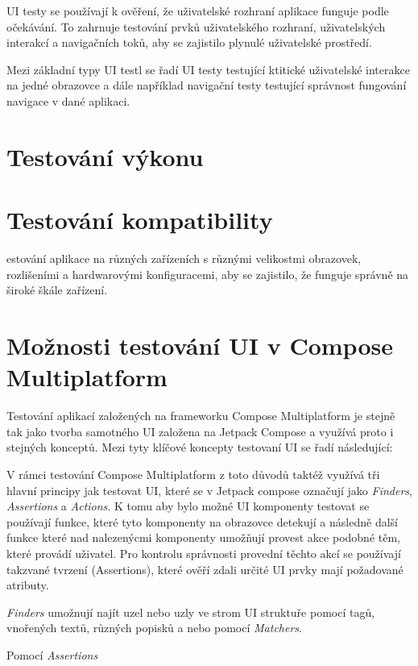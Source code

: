 UI testy se používají k ověření, že uživatelské rozhraní aplikace funguje podle očekávání. To zahrnuje testování prvků uživatelského rozhraní, uživatelských 
interakcí a navigačních toků, aby se zajistilo plynulé uživatelské prostředí.

Mezi základní typy UI testl se řadí UI testy testující ktitické uživatelské interakce na jedné obrazovce a dále například navigační testy testující
správnost fungování navigace v dané aplikaci.


\section{Testování výkonu}


\section{Testování kompatibility}
estování aplikace na různých zařízeních s různými velikostmi obrazovek, rozlišeními a hardwarovými konfiguracemi, aby se zajistilo, že funguje 
správně na široké škále zařízení.




\section{Možnosti testování UI v Compose Multiplatform}
Testování aplikací založených na frameworku Compose Multiplatform je stejně tak jako tvorba samotného UI založena na Jetpack Compose a využívá 
proto i stejných konceptů. Mezi tyty klíčové koncepty testovaní UI se řadí následující:


V rámci testování
Compose Multiplatform z toto důvodů taktéž využívá tři hlavní principy jak testovat UI, které se v Jetpack compose
označují jako \textit{Finders}, \textit{Assertions} a \textit{Actions}. 
K tomu aby bylo možné UI komponenty testovat se používají funkce, které tyto komponenty na obrazovce detekují a následně další funkce které nad nalezenýcmi 
komponenty umožňují provest akce podobné těm, které provádí uživatel. Pro kontrolu správnosti provední těchto akcí se používají takzvané tvrzení 
(Assertions), které ověří zdali určité UI prvky mají požadované atributy.

\textit{Finders} umožnují najít uzel nebo uzly ve strom UI struktuře pomocí tagů, vnořených textů, různých popisků a nebo pomocí \textit{Matchers}.


Pomocí \textit{Assertions}

